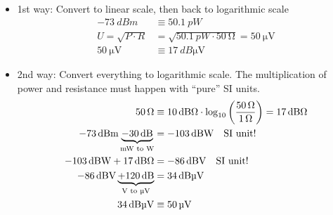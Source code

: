 \begin{solution}
\begin{tasks}
		\begin{itemize}
			\item 1st way: Convert to linear scale, then back to logarithmic scale
			\begin{equation*}
				\begin{split}
					\SI{-73}{dBm} &\equiv \SI{50.1}{pW} \\
					U = \sqrt{P \cdot R} &= \sqrt{\SI{50.1}{pW} \cdot \SI{50}{\ohm}} = \SI{50}{\micro\volt} \\
					\SI{50}{\micro\volt} &\equiv \SI{17}{dB\micro\volt}
				\end{split}
			\end{equation*}
			\item 2nd way: Convert everything to logarithmic scale. The multiplication of power and resistance must happen with ``pure'' SI units.
			\begin{equation*}
			\begin{split}
				\SI{50}{\ohm} &\equiv \SI{10}{dB\ohm} \cdot \log_{10} \left(\frac{\SI{50}{\ohm}}{\SI{1}{\ohm}}\right) = \SI{17}{dB\ohm} \\
				\SI{-73}{dBm} \underbrace{- \SI{30}{dB}}_{\text{\si{mW} to \si{W}}} &= \SI{-103}{dBW} \quad \text{SI unit!} \\
				\SI{-103}{dBW} + \SI{17}{dB\ohm} &= \SI{-86}{dBV} \quad \text{SI unit!} \\
				\SI{-86}{dBV} \underbrace{+ \SI{120}{dB}}_{\text{\si{V} to \si{\micro\volt}}} &= \SI{34}{dB\micro\volt} \\
				\SI{34}{dB\micro\volt} &\equiv \SI{50}{\micro\volt}
			\end{split}
			\end{equation*}
		\end{itemize}
	\end{tasks}
\end{solution}

